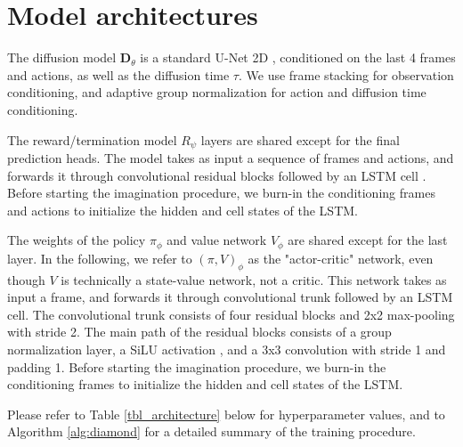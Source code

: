 \section{Model architectures}\label{app:architectures}

The diffusion model $\mathbf{D}_\theta$ is a standard U-Net 2D \citep{ronneberger2015unet}, conditioned on the last 4 frames and actions, as well as the diffusion time $\tau$. We use frame stacking for observation conditioning, and adaptive group normalization \citep{adagn} for action and diffusion time conditioning.

The reward/termination model $R_\psi$ layers are shared except for the final prediction heads. The model takes as input a sequence of frames and actions, and forwards it through convolutional residual blocks \citep{He2015} followed by an LSTM cell \citep{a3c,lstm,Gers2000}. Before starting the imagination procedure, we burn-in \citep{r2d2} the conditioning frames and actions to initialize the hidden and cell states of the LSTM. 

The weights of the policy $\pi_\phi$ and value network $V_\phi$ are shared except for the last layer. In the following, we refer to $(\pi,V)_\phi$ as the "actor-critic" network, even though $V$ is technically a state-value network, not a critic. This network takes as input a frame, and forwards it through convolutional trunk followed by an LSTM cell. The convolutional trunk consists of four residual blocks and 2x2 max-pooling with stride 2. The main path of the residual blocks consists of a group normalization \citep{groupnorm} layer, a SiLU activation \citep{elfwing2018sigmoid}, and a 3x3 convolution with stride 1 and padding 1. Before starting the imagination procedure, we burn-in the conditioning frames to initialize the hidden and cell states of the LSTM. 


Please refer to Table \ref{tbl_architecture} below for hyperparameter values, and to Algorithm \ref{alg:diamond} for a detailed summary of the training procedure. 

\vspace{1cm}

